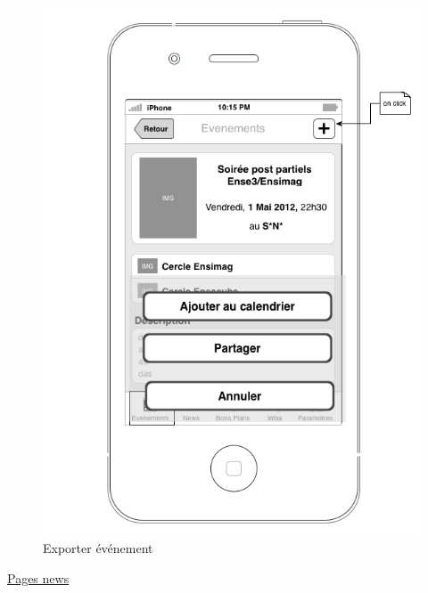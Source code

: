 \documentclass[a4paper, 11pt]{article}
\begin{document}
\begin{figure}[h!]
\begin{minipage}[c]{.50\linewidth}
\begin{center}
			\includegraphics[scale=0.28]{../../Sketch/iOS/evenements_detail_plus.png}
		\end{center}
	\caption{Exporter événement}
	\end{minipage}
\end{figure}
\vfill
\clearpage

\underline{Pages news}
\end{document}

